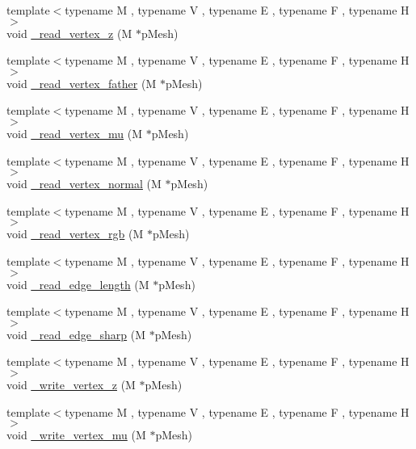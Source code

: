 \begin{DoxyCompactItemize}
\item 
{\footnotesize template$<$typename M , typename V , typename E , typename F , typename H $>$ }\\void \hyperlink{namespace_mesh_lib_a4f1406eba0ac53ede756bca8efacd788}{\+\_\+read\+\_\+vertex\+\_\+z} (M $\ast$p\+Mesh)
\item 
{\footnotesize template$<$typename M , typename V , typename E , typename F , typename H $>$ }\\void \hyperlink{namespace_mesh_lib_a92f633b4ea7e30c040b81dc8895f71e7}{\+\_\+read\+\_\+vertex\+\_\+father} (M $\ast$p\+Mesh)
\item 
{\footnotesize template$<$typename M , typename V , typename E , typename F , typename H $>$ }\\void \hyperlink{namespace_mesh_lib_a7ed997bd5b6fa91b0c9de6129f8b3f5e}{\+\_\+read\+\_\+vertex\+\_\+mu} (M $\ast$p\+Mesh)
\item 
{\footnotesize template$<$typename M , typename V , typename E , typename F , typename H $>$ }\\void \hyperlink{namespace_mesh_lib_a9b33c0e7e2116a58961c6d004cf6799d}{\+\_\+read\+\_\+vertex\+\_\+normal} (M $\ast$p\+Mesh)
\item 
{\footnotesize template$<$typename M , typename V , typename E , typename F , typename H $>$ }\\void \hyperlink{namespace_mesh_lib_aac275eedfecdadd5de1801c33904274f}{\+\_\+read\+\_\+vertex\+\_\+rgb} (M $\ast$p\+Mesh)
\item 
{\footnotesize template$<$typename M , typename V , typename E , typename F , typename H $>$ }\\void \hyperlink{namespace_mesh_lib_a7ce9ef901694368ab52b10d899d4f0a2}{\+\_\+read\+\_\+edge\+\_\+length} (M $\ast$p\+Mesh)
\item 
{\footnotesize template$<$typename M , typename V , typename E , typename F , typename H $>$ }\\void \hyperlink{namespace_mesh_lib_aaf7a33dcbd7f629d69de2d7afb5fcf26}{\+\_\+read\+\_\+edge\+\_\+sharp} (M $\ast$p\+Mesh)
\item 
{\footnotesize template$<$typename M , typename V , typename E , typename F , typename H $>$ }\\void \hyperlink{namespace_mesh_lib_a06158718dbbcbd1ee2b29abe2e606d9c}{\+\_\+write\+\_\+vertex\+\_\+z} (M $\ast$p\+Mesh)
\item 
{\footnotesize template$<$typename M , typename V , typename E , typename F , typename H $>$ }\\void \hyperlink{namespace_mesh_lib_a4bfb121963ba879caaa7c306f33b193f}{\+\_\+write\+\_\+vertex\+\_\+mu} (M $\ast$p\+Mesh)

\end{DoxyCompactItemize}
